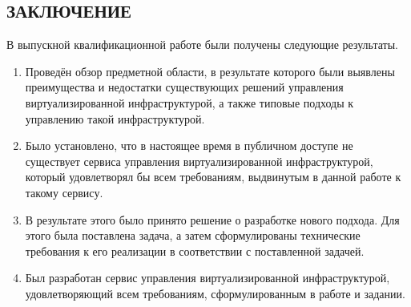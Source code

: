 \begin{center}
\section*{ЗАКЛЮЧЕНИЕ}
\end{center}
В выпускной квалификационной работе были получены следующие результаты.
\begin{enumerate}
    \item Проведён обзор предметной области, в результате которого были выявлены преимущества и недостатки существующих решений управления виртуализированной инфраструктурой, а также типовые подходы к управлению такой инфраструктурой.
    \item Было установлено, что в настоящее время в публичном доступе не существует сервиса управления виртуализированной инфраструктурой, который удовлетворял бы всем требованиям, выдвинутым в данной работе к такому сервису.
    \item В результате этого было принято решение о разработке нового подхода. Для этого была поставлена задача, а затем сформулированы технические требования к его реализации в соответствии с поставленной задачей.
    \item Был разработан сервис управления виртуализированной инфраструктурой, удовлетворяющий всем требованиям, сформулированным в работе и задании.
\end{enumerate}
